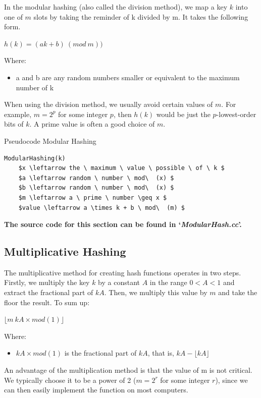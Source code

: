 \documentclass[12pt]{article}
\begin{document}
{In the modular hashing (also called the division method), we map a key $k$ into one of $m$ slots by taking the reminder of k divided by m. It takes the following form. 

\begin{center} $h(k) = (ak+b)\  (mod \ m))$ \end{center}

Where: 
\begin{itemize}
\item a and b are any random numbers smaller or equivalent to the maximum number of k 
\end{itemize}

When using the division method, we usually avoid certain values of $m$. For example, $m = 2^p$ for some integer $p$, then $h(k)$ would be just the $p$-lowest-order bits of $k$. A prime value is often a good choice of $m$.

\begin{center}
\begin{large}
Pseudocode Modular Hashing
\end{large}
\end{center}

\begin{lstlisting}[mathescape=true]
ModularHashing(k)
	$x \leftarrow the \ maximum \ value \ possible \ of \ k $
	$a \leftarrow random \ number \ mod\  (x) $
	$b \leftarrow random \ number \ mod\  (x) $
	$m \leftarrow a \ prime \ number \geq x $
	$value \leftarrow a \times k + b \ mod\  (m) $

\end{lstlisting}

\textbf{The source code for this section can be found in `\textit{ModularHash.cc}'.}
\bigskip

\subsection{Multiplicative Hashing}
The multiplicative method for creating hash functions operates in two steps.
Firstly, we multiply the key $k$ by a constant $A$ in the range $0<A<1$ and extract the fractional part of $kA$. Then, we multiply this value by $m$ and take the floor the result. To sum up:  

\begin{center}
 $ \lfloor m\ kA \times mod(1)  \rfloor$
\end{center}
Where:
\begin{itemize}
\item $kA  \times mod(1)$  is the fractional part of $kA$, that is, $kA- \lfloor kA \rfloor$
\end{itemize}
An advantage of the multiplication method is that the value of m is not critical. We typically choose it to be a power of 2 ($m = 2^r$ for some integer $r$), since we can then easily implement the function on most computers.

}
\end{document}

